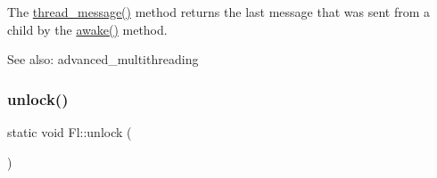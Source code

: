 The \hyperlink{group__fl__multithread_ga1fb3dbbd66eacb7ba26e0c0d724c0265}{thread\+\_\+message()} method returns the last message that was sent from a child by the \hyperlink{group__fl__multithread_ga3e0b97c90d624efd2362774efc0324e4}{awake()} method.

See also\+: advanced\+\_\+multithreading \mbox{\label{group__fl__multithread_gaccda832deb874af4e9423db192ccfca4}} 
\subsubsection{\texorpdfstring{unlock()}{unlock()}}
{\footnotesize\ttfamily static void Fl\+::unlock (\begin{DoxyParamCaption}{ }\end{DoxyParamCaption})\hspace{0.3cm}{\ttfamily [static]}}

